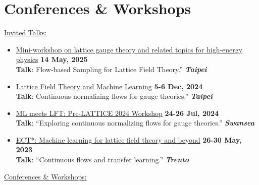 \documentclass[11pt]{article}
\newcommand{\dateright}[1]{\hfill \textbf{#1}}
\begin{document}
\section*{Conferences \& Workshops}
\underline{Invited Talks:}
\begin{itemize}[left=0pt, itemsep=5pt]
    \item {\href{https://indico.phys.nthu.edu.tw/event/149/timetable/#20250514}{Mini-workshop on lattice gauge theory and related topics for high-energy physics}} \dateright{ 14 May, 2025} \\
    {\footnotesize \textbf{Talk}: Flow-based Sampling for Lattice Field Theory.”} \dateright{{\color{black}\textit{Taipei}}}

    \item {\href{https://indico.phys.sinica.edu.tw/event/133/}{Lattice Field Theory and Machine Learning}} \dateright{ 5-6 Dec, 2024} \\
    {\footnotesize \textbf{Talk}: Continuous normalizing flows for gauge theories.”} \dateright{{\color{black}\textit{Taipei}}}

    \item {\href{http://pyweb.swan.ac.uk/~aarts/ml-lft-2024-programme.html}{ML meets LFT: Pre-LATTICE 2024 Workshop}} \dateright{ 24-26 Jul, 2024} \\
    {\footnotesize \textbf{Talk}: “Exploring continuous normalizing flows for gauge theories.”} \dateright{{\color{black}\textit{Swansea}}}

    \item {\href{https://indico.ectstar.eu/event/171/contributions/3849/}{ECT*: Machine learning for lattice field theory and beyond}} \dateright{ 26-30 May, 2023} \\
    {\footnotesize \textbf{Talk}: “Continuous flows and transfer learning.”} \dateright{{\color{black}\textit{Trento}}}

\end{itemize}

\underline{Conferences \& Workshops:}
\end{document}
